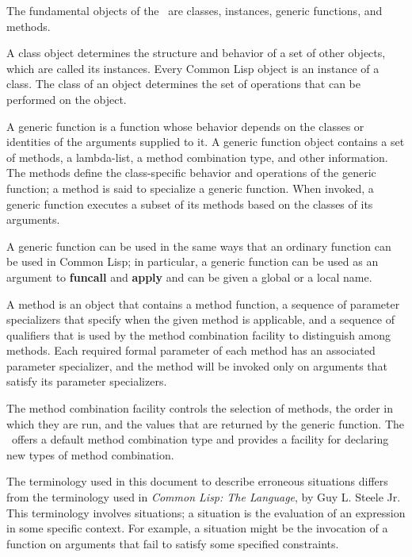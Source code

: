 The fundamental objects of the \CLOS\ are classes, instances,
generic functions, and methods. 

A {\bit class\/} object determines the structure and behavior of a set
of other objects, which are called its {\bit instances}. 
Every Common Lisp object is an {\bit
instance\/} of a class.  The class of an object determines the set of
operations that can be performed on the object.

A {\bit generic function\/} is a function whose behavior depends on the
classes or identities of the arguments supplied to it.  A generic
function object contains a set of methods, a lambda-list, a
method combination type, and other information.  The {\bit methods} define
the class-specific behavior and operations of the generic function; a
method is said to {\bit specialize\/} a generic function.  When invoked,
a generic function executes a subset of its methods based on the
classes of its arguments.

A generic function can be used in 
the same ways that an ordinary function can be used in Common Lisp; in
particular, a generic function can be used as an argument to {\bf
funcall} and {\bf apply} and can be given a global or a local name.

A {\bit method\/} is an object that contains a method function, a sequence of
{\bit parameter specializers\/} that specify when the given method is
applicable, and a sequence of {\bit qualifiers\/} that is used by the
{\bit method combination\/} facility to distinguish among methods.  Each
required formal parameter of each method has an associated parameter
specializer, and the method will be invoked only on arguments that
satisfy its parameter specializers.

The method combination facility controls the selection of methods, the
order in which they are run, and the values that are returned by the
generic function.  The \CLOS\ offers a default method combination type
and provides a facility for declaring new types of method combination.

\endSection%


The terminology used in this document to describe erroneous
situations differs from the terminology used in {\it Common Lisp:
The Language}, by Guy L. Steele Jr.  This terminology involves {\bit
situations}; a situation is the evaluation of an expression in some
specific context. For example, a situation might be the invocation of
a function on arguments that fail to satisfy some specified
constraints.

